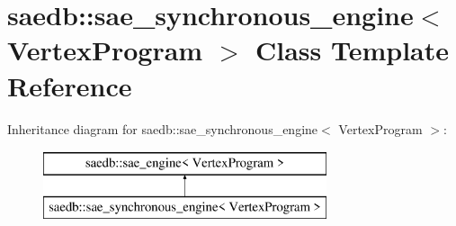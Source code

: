\hypertarget{classsaedb_1_1sae__synchronous__engine}{\section{saedb\-:\-:sae\-\_\-synchronous\-\_\-engine$<$ Vertex\-Program $>$ Class Template Reference}
\label{d7/d39/classsaedb_1_1sae__synchronous__engine}
}
Inheritance diagram for saedb\-:\-:sae\-\_\-synchronous\-\_\-engine$<$ Vertex\-Program $>$\-:\begin{figure}[H]
\begin{center}
\leavevmode
\includegraphics[height=2.000000cm]{d7/d39/classsaedb_1_1sae__synchronous__engine}
\end{center}
\end{figure}
